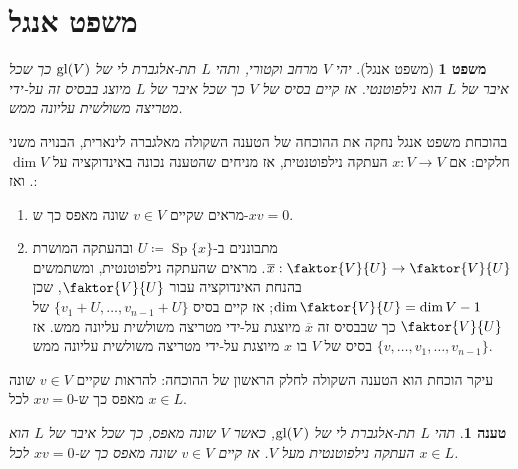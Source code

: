 \documentclass{report}
\theoremstyle{break}
\newtheorem{theorem}{משפט}[chapter]
\newtheorem{preposition}[preposition]{טענה}
\theoremstyle{MyNonumberbreak}
\DeclareMathOperator{\Sp}{Sp}
\begin{document}
\section{משפט אנגל}
\begin{theorem}[משפט אנגל] \label{thm:first-engel}
	יהי $V$ מרחב וקטורי, ותהי $L$ תת-אלגברת לי של $\operatorname{gl}(V)$ כך שכל איבר של $L$ הוא נילפוטנטי. אז קיים בסיס של $V$ כך שכל איבר של $L$ מיוצג בבסיס זה על-ידי מטריצה משולשית עליונה ממש.
\end{theorem}
בהוכחת משפט אנגל נחקה את ההוכחה של הטענה השקולה מאלגברה לינארית, הבנויה משני חלקים: אם $x : V \to V$ העתקה נילפוטנטית, אז מניחים שהטענה נכונה באינדוקציה על $\dim V$. ואז:
\begin{enumerate}
	\item 
	מראים שקיים $v \in V$ שונה מאפס כך ש-$xv = 0$.
	\item
	מתבוננים ב-$U \coloneqq \Sp\{x\}$ ובהעתקה המושרת $\overline{x} : \faktor{V}{U} \to \faktor{V}{U}$. מראים שהעתקה נילפוטנטית, ומשתמשים בהנחת האינדוקציה עבור $\faktor{V}{U}$, שכן $\dim\faktor{V}{U} = \dim V - 1$; אז קיים בסיס $\{v_1 + U, \ldots, v_{n-1} + U\}$ של $\faktor{V}{U}$ כך שבבסיס זה $\overline{x}$ מיוצגת על-ידי מטריצה משולשית עליונה ממש. אז $\{v, \ldots, v_1, \ldots, v_{n-1}\}$ בסיס של $V$ בו $x$ מיוצגת על-ידי מטריצה משולשית עליונה ממש.
\end{enumerate}
עיקר הוכחת הוא הטענה השקולה לחלק הראשון של ההוכחה: להראות שקיים $v \in V$ שונה מאפס כך ש-$xv = 0$ לכל $x \in L$.
\begin{preposition} \label{prep:pre-Engel}
	תהי $L$ תת-אלגברת לי של $\operatorname{gl}(V)$, כאשר $V$ שונה מאפס, כך שכל איבר של $L$ הוא העתקה נילפוטנטית מעל $V$. אז קיים $v \in V$ שונה מאפס כך ש-$xv = 0$ לכל $x \in L$.
\end{preposition}
\end{document}
